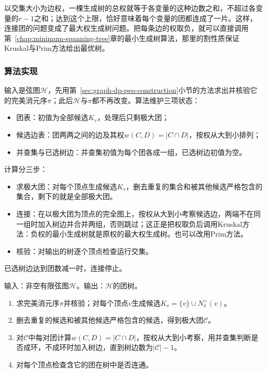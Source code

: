 以交集大小为边权，一棵生成树的总权就等于各变量的这种边数之和，不超过各变量的$r-1$之和；达到这个上限，恰好意味着每个变量的团都连成了一片。这样，连接团的问题变成了最大权生成树问题。把每条边的权取负，就可以直接调用第~\ref{chap:minimum-spanning-tree}章的最小生成树算法，那里的割性质保证Kruskal与Prim方法给出最优树。

\subsubsection{算法实现}

输入是弦图$\mathcal H$，先用第~\ref{sec:graph-dp-peo-construction}小节的方法求出并核验它的完美消元序$\pi$；此后$\mathcal H$与$\pi$都不再改变。算法维护三项状态：
\begin{itemize}
  \item 团表：初值为全部候选$K_v$，处理后只剩极大团；
  \item 候选边表：团两两之间的边及其权$w(C,D)=|C\cap D|$，按权从大到小排列；
  \item 并查集与已选树边：并查集初值为每个团各成一组，已选树边初值为空。
\end{itemize}
计算分三步：
\begin{itemize}
  \item 求极大团：对每个顶点生成候选$K_v$，删去重复的集合和被其他候选严格包含的集合，剩下的就是全部极大团。
  \item 连接：在以极大团为顶点的完全图上，按权从大到小考察候选边，两端不在同一组时加入树边并合并两组，否则跳过；这正是把权取负后调用Kruskal方法：负权的最小生成树就是原权的最大权生成树。也可以改用Prim方法。
  \item 核验：对输出的树逐个顶点检查运行交集。
\end{itemize}
已选树边达到团数减一时，连接停止。

\begin{algorithm}[由弦图构造团树]
\label{alg:graph-dp-clique-tree}
输入：非空有限弦图$\mathcal H$。输出：$\mathcal H$的团树。
\begin{enumerate}
  \item 求完美消元序$\pi$并核验；对每个顶点$v$生成候选$K_v=\{v\}\cup N^+_\pi(v)$。
  \item 删去重复的候选和被其他候选严格包含的候选，得到极大团$\mathcal C$。
  \item 对$\mathcal C$中每对团计算$w(C,D)=|C\cap D|$，按权从大到小考察，用并查集判断是否成环，不成环时加入树边，直到树边数为$|\mathcal C|-1$。
  \item 对每个顶点检查含它的团在树中是否连通。
\end{enumerate}
\end{algorithm}

